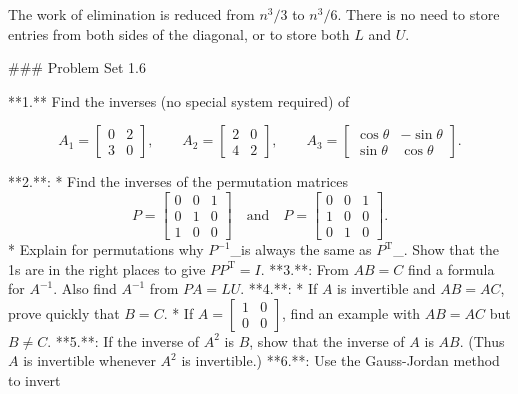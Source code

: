 The work of elimination is reduced from \(n^{3}/3\) to \(n^{3}/6\). There is no need to store entries from both sides of the diagonal, or to store both \(L\) and \(U\).

### Problem Set 1.6

**1.** Find the inverses (no special system required) of

\[A_{1}=\begin{bmatrix}0&2\\ 3&0\end{bmatrix},\qquad A_{2}=\begin{bmatrix}2&0\\ 4&2\end{bmatrix},\qquad A_{3}=\begin{bmatrix}\cos\theta&-\sin\theta\\ \sin\theta&\cos\theta\end{bmatrix}.\]

**2.**:
* Find the inverses of the permutation matrices \[P=\begin{bmatrix}0&0&1\\ 0&1&0\\ 1&0&0\end{bmatrix}\quad\text{and}\quad P=\begin{bmatrix}0&0&1\\ 1&0&0\\ 0&1&0\end{bmatrix}.\]
* Explain for permutations why \(P^{-1}\)_is always the same as \(P^{\mathrm{T}}\)_. Show that the 1s are in the right places to give \(PP^{\mathrm{T}}=I\).
**3.**: From \(AB=C\) find a formula for \(A^{-1}\). Also find \(A^{-1}\) from \(PA=LU\).
**4.**:
* If \(A\) is invertible and \(AB=AC\), prove quickly that \(B=C\).
* If \(A=\begin{bmatrix}1&0\\ 0&0\end{bmatrix}\), find an example with \(AB=AC\) but \(B\neq C\).
**5.**: If the inverse of \(A^{2}\) is \(B\), show that the inverse of \(A\) is \(AB\). (Thus \(A\) is invertible whenever \(A^{2}\) is invertible.)
**6.**: Use the Gauss-Jordan method to invert

